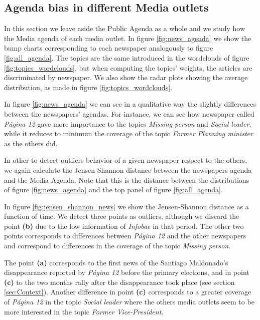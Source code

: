 \documentclass{bmcart}
\begin{document}
\subsection*{Agenda bias in different Media outlets}

\par In this section we leave aside the Public Agenda as a whole and we study how the Media agenda of each media outlet. 
In figure \ref{fig:news_agenda} we show the bump charts corresponding to each newspaper analogously to figure \ref{fig:all_agenda}.
The topics are the same introduced in the wordclouds of figure \ref{fig:topics_wordclouds}, but when computing the topics' weights,  the articles are discriminated by newspaper. 
We also show the radar plots showing the average distribution, as made in figure \ref{fig:topics_wordclouds}. 
\par In figure \ref{fig:news_agenda} we can see in a qualitative way the slightly differences between the newspapers' agendas.
For instance, we can see how newspaper called \emph{P\'agina 12} gave more importance to the topics \emph{Missing person} and \emph{Social leader}, while it reduces to minimum the coverage of the topic  \emph{Former Planning minister} as the others did.

\par In other to detect outliers behavior of a given newspaper respect to the others, we again calculate the Jensen-Shannon distance between the newspapers agenda and the Media Agenda.
Note that this is the distance between the distributions of figure \ref{fig:news_agenda} and the top panel of figure \ref{fig:all_agenda}.
\par In figure \ref{fig:jensen_shannon_news} we show the Jensen-Shannon distance as a function of time.
We detect three points as outliers, although we discard the point \textbf{(b)} due to the low information of \emph{Infobae} in that period. 
The other two points corresponds to differences between \emph{P\'agina 12} and the other newspapers and correspond to differences in the coverage of the topic \emph{Missing person}.

\par The point \textbf{(a)} corresponds  to the first news of the Santiago Maldonado's disappearance  reported by \emph{P\'agina 12} before the primary elections, and in point \textbf{(c)} to  the two months rally after the disappearance took place (see section \ref{sec:Context}). Another difference in point \textbf{(c)} corresponds to a greater coverage of \emph{P\'agina 12} in the topic \emph{Social leader} where the others media outlets seem to be more interested in the topic \emph{Former Vice-President}.
\end{document}
